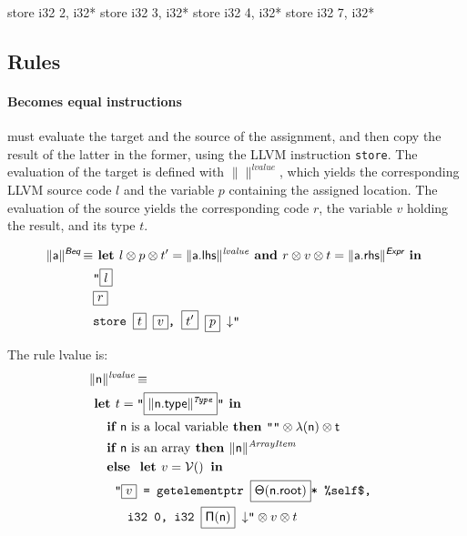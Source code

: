 \documentclass[10pt,a4paper]{article}
\newcommand{\trad}[2]{\ensuremath{\lVert \textsf{#1} \rVert^{\textit{#2}}}}
\newcommand{\nl}[0]{\ensuremath{\downarrow}}
\DeclareMathOperator{\isdef}{\equiv}
\DeclareMathOperator{\variable}{\mathcal{V}()}
\newcommand{\llvm}[1]{\texttt{#1}}
\newcommand{\B}[1]{\textsf{#1}}
\newcommand{\IF}[0]{\textbf{ if }}
\newcommand{\ELSE}[0]{\textbf{ else }}
\newcommand{\THEN}[0]{\textbf{ then }}
\newcommand{\LET}[0]{\textbf{ let }}
\newcommand{\IN}[0]{\textbf{ in }}
\newcommand{\AND}[0]{\textbf{ and }}
\newcommand{\PH}[1]{\framebox{$#1$}}
\newcommand{\sep}[0]{\otimes}
\newcommand{\local}[0]{\ensuremath{\sf\lambda}}
\newcommand{\idx}[0]{\ensuremath{\sf\Pi}}
\newcommand{\state}[0]{\ensuremath{\sf\Theta}}
\begin{document}
\begin{llvmcode}
store i32 2, i32* %
store i32 3, i32* %
store i32 4, i32* %
store i32 7, i32* %
\end{llvmcode}


\subsection{Rules}


\paragraph{Becomes equal instructions} must evaluate the target and the source
of the assignment, and then copy the result of the latter in the former, using
the LLVM instruction \llvm{store}. The evaluation of the target is defined with
$\trad{}{lvalue}$, which yields the corresponding LLVM source code $l$ and the
variable $p$ containing the assigned location. The evaluation of the source
yields the corresponding code $r$, the variable $v$ holding the result, and its
type $t$. 

\begin{align*}
\begin{split}
  \trad{a}{\B{Beq}} \isdef
  & \LET l \sep p \sep t'= \trad{a.lhs}{lvalue} \AND r \sep v \sep t = \trad{a.rhs}{\B{Expr}} \IN \\
  & \llvm{"\PH{l}} \\
  & \llvm{\PH{r}} \\
  & \llvm{store \PH{t} \PH{v}, \PH{t'} \PH{p} \nl"}
\end{split}
\end{align*}

The rule lvalue is:
\begin{align*}
\lefteqn{\trad{n}{lvalue} \isdef} \\
& \LET t = \llvm{"\PH{\trad{\B{n.type}}{Type}}"} \IN \\
& \quad \IF \mbox{\B{n} is a local variable} \THEN \llvm{""} \sep \local(\B{n}) \sep t \\
& \quad \IF \mbox{\B{n} is an array} \THEN  \trad{n}{ArrayItem} \\
& \quad \ELSE \LET v = \variable \IN \\
& \quad \quad \llvm{"\PH{v} = getelementptr \PH{\state(\B{n.root})}* \%self\$,} \\
& \quad \quad \quad \llvm{i32 0, i32 \PH{\idx(\B{n})} \nl"} \sep v \sep t
\end{align*}
\end{document}
